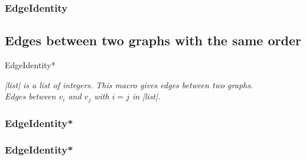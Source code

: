 \subsubsection{EdgeIdentity}
\begin{center}
\begin{tkzexample}
\end{tkzexample}
\end{center}

\vfill
\newpage
\subsection{Edges between two graphs with the same order }

\begin{NewMacroBox}{EdgeIdentity*}{}

\medskip
\emph{|list| is a list of  integers. This macro gives edges between two graphs.\\
Edges between $v_i$ and $v_j$ with $i=j$ in |list|.\\}

\end{NewMacroBox}

\subsubsection{EdgeIdentity*}
\begin{center}
\begin{tkzexample}
\end{tkzexample}
\end{center}

\subsubsection{EdgeIdentity*}
\begin{center}
\begin{tkzexample}
\end{tkzexample}
\end{center}

